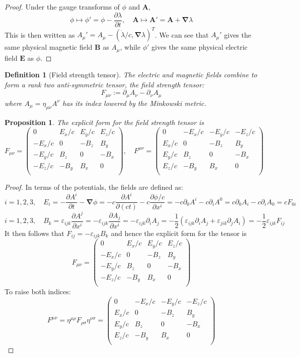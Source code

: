 \documentclass[a4paper]{article}
\theoremstyle{new}
\newtheorem{defi}{Definition}[section]
\newtheorem{prop}{Proposition}[section]
\begin{document}
\begin{proof}
Under the gauge transforms of $\phi$ and $\mathbf{A}$,
$$\phi\mapsto\phi'=\phi-\frac{\partial\lambda}{\partial t},\quad\mathbf{A}\mapsto\mathbf{A'}=\mathbf{A}+\boldsymbol{\nabla}\lambda$$
This is then written as $A_\mu'=A_\mu-(\dot{\lambda}/c,\boldsymbol{\nabla}\lambda)^T$. We can see that $A_\mu'$ gives the same physical magnetic field $\mathbf{B}$ as $A_\mu$, while $\phi'$ gives the same physical electric field $\mathbf{E}$ as $\phi$.
\end{proof}
\begin{defi}[Field strength tensor]
The electric and magnetic fields combine to form a rank two anti-symmetric tensor, the field strength tensor:
$$F_{\mu\nu}:=\partial_\mu A_\nu-\partial_\nu A_\mu$$
where $A_\mu=\eta_{\mu\nu}A^\nu$ has its index lowered by the Minkowski metric.
\end{defi}
\begin{prop}
The explicit form for the field strength tensor is
$$F_{\mu\nu}=\begin{pmatrix}0&E_x/c&E_y/c&E_z/c\\-E_x/c&0&-B_z&B_y\\-E_y/c&B_z&0&-B_x\\-E_z/c&-B_y&B_x&0\\\end{pmatrix},\quad F^{\mu\nu}=\begin{pmatrix}0&-E_x/c&-E_y/c&-E_z/c\\E_x/c&0&-B_z&B_y\\E_y/c&B_z&0&-B_x\\E_z/c&-B_y&B_x&0\\\end{pmatrix}$$
\end{prop}
\begin{proof}
In terms of the potentials, the fields are defined as:
$$i=1,2,3,\quad E_i=-\frac{\partial A^i}{\partial t}-\boldsymbol{\nabla}\phi=-c\frac{\partial A^i}{\partial(ct)}-c\frac{\partial\phi/c}{\partial x^i}=-c\partial_0A^i-c\partial_iA^0=c\partial_0A_i-c\partial_iA_0=cF_{0i}$$
$$i=1,2,3,\quad B_k=\varepsilon_{ijk}\frac{\partial A^j}{\partial x^i}=-\varepsilon_{ijk}\frac{\partial A_j}{\partial x^i}=-\varepsilon_{ijk}\partial_iA_j=-\frac{1}{2}(\varepsilon_{ijk}\partial_iA_j+\varepsilon_{jik}\partial_jA_i)=-\frac{1}{2}\varepsilon_{ijk}F_{ij}$$
It then follows that $F_{ij}=-\varepsilon_{ijk}B_k$ and hence the explicit form for the tensor is
$$F_{\mu\nu}=\begin{pmatrix}0&E_x/c&E_y/c&E_z/c\\-E_x/c&0&-B_z&B_y\\-E_y/c&B_z&0&-B_x\\-E_z/c&-B_y&B_x&0\\\end{pmatrix}$$
To raise both indices:
$$F^{\mu\nu}=\eta^{\mu\rho}F_{\rho\sigma}\eta^{\nu\sigma}=\begin{pmatrix}0&-E_x/c&-E_y/c&-E_z/c\\E_x/c&0&-B_z&B_y\\E_y/c&B_z&0&-B_x\\E_z/c&-B_y&B_x&0\\\end{pmatrix}$$
\end{proof}
\end{document}
